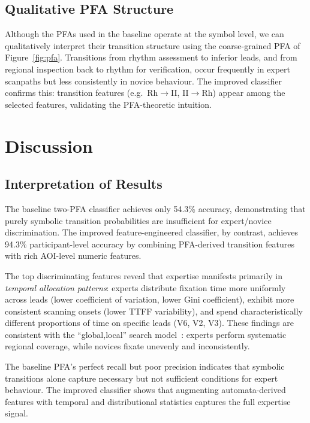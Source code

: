 \documentclass[sigconf]{acmart}
\theoremstyle{plain}
\theoremstyle{definition}
\begin{document}
\subsection{Qualitative PFA Structure}

Although the PFAs used in the baseline operate at the symbol level, we can qualitatively interpret their transition structure using the coarse-grained PFA of Figure~\ref{fig:pfa}.
Transitions from rhythm assessment to inferior leads, and from regional inspection back to rhythm for verification, occur frequently in expert scanpaths but less consistently in novice behaviour.
The improved classifier confirms this: transition features (e.g.\ Rh$\rightarrow$II, II$\rightarrow$Rh) appear among the selected features, validating the PFA-theoretic intuition.

\section{Discussion}

\subsection{Interpretation of Results}

The baseline two-PFA classifier achieves only 54.3\% accuracy, demonstrating that purely symbolic transition probabilities are insufficient for expert/novice discrimination.
The improved feature-engineered classifier, by contrast, achieves 94.3\% participant-level accuracy by combining PFA-derived transition features with rich AOI-level numeric features.

The top discriminating features reveal that expertise manifests primarily in \emph{temporal allocation patterns}: experts distribute fixation time more uniformly across leads (lower coefficient of variation, lower Gini coefficient), exhibit more consistent scanning onsets (lower TTFF variability), and spend characteristically different proportions of time on specific leads (V6, V2, V3).
These findings are consistent with the ``global,local'' search model~\cite{kundel1978}: experts perform systematic regional coverage, while novices fixate unevenly and inconsistently.

The baseline PFA's perfect recall but poor precision indicates that symbolic transitions alone capture necessary but not sufficient conditions for expert behaviour.
The improved classifier shows that augmenting automata-derived features with temporal and distributional statistics captures the full expertise signal.
\end{document}

